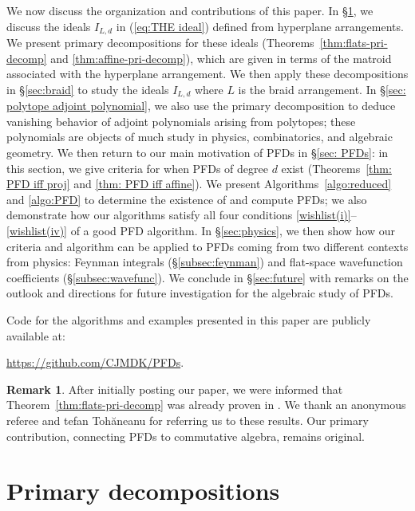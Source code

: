 \documentclass [a4paper,reqno, 11pt]{amsart}
\theoremstyle{plain}
\theoremstyle{plain}
\theoremstyle{plain}
\theoremstyle{plain}
\theoremstyle{definition}
\theoremstyle{definition}
\theoremstyle{definition}
\newtheorem{remark}[theorem]{Remark}
\theoremstyle{definition}
\theoremstyle{definition}
\theoremstyle{definition}
\begin{document}
We now discuss the organization and contributions of this paper. In \S\ref{sec: primary decompositions}, we discuss the ideals $I_{L,d}$ in (\ref{eq:THE ideal}) defined from hyperplane arrangements. We present primary decompositions for these ideals (Theorems~\ref{thm:flats-pri-decomp} and \ref{thm:affine-pri-decomp}), which are given in terms of the matroid associated with the hyperplane arrangement. 
We then apply these decompositions in \S\ref{sec:braid} to study the ideals $I_{L,d}$ where $L$ is the braid arrangement. In \S\ref{sec: polytope adjoint polynomial}, we also use the primary decomposition to deduce vanishing behavior of adjoint polynomials arising from polytopes; these polynomials are objects of much study in physics, combinatorics, and algebraic geometry. We then return to our main motivation of PFDs in \S\ref{sec: PFDs}: in this section, we give criteria for when PFDs of degree $d$ exist (Theorems~\ref{thm: PFD iff proj} and \ref{thm: PFD iff affine}). We present Algorithms~\ref{algo:reduced} and \ref{algo:PFD} to determine the existence of and compute PFDs; we also demonstrate how our algorithms satisfy all four conditions \ref{wishlist(i)}--\ref{wishlist(iv)} of a good PFD algorithm. In \S\ref{sec:physics}, we then show how our criteria and algorithm can be applied to PFDs coming from two different contexts from physics: Feynman integrals (\S\ref{subsec:feynman}) and flat-space wavefunction coefficients (\S\ref{subsec:wavefunc}). We conclude in \S\ref{sec:future} with remarks on the outlook and directions for future investigation for the algebraic study of PFDs.


Code for the algorithms and examples presented in this paper are publicly available at:

\begin{center}
    \small
    \url{https://github.com/CJMDK/PFDs}. 
\end{center}

\begin{remark}
    After initially posting our paper, we were informed that Theorem~\ref{thm:flats-pri-decomp} was already proven in \cite{BTX, Toh}. We thank an anonymous referee and tefan Toh\u{a}neanu for referring us to these results. Our primary contribution, connecting PFDs to commutative algebra, remains original. 
\end{remark}



\section{Primary decompositions}\label{sec: primary decompositions}
\end{document}
